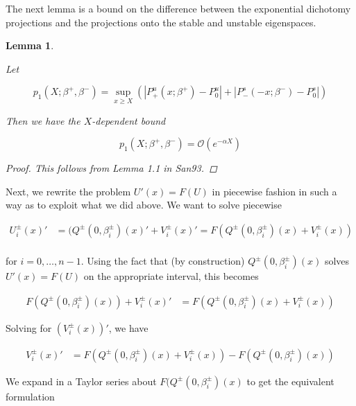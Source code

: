 \documentclass[12pt]{article}
\newtheorem{lemma}{Lemma}
\begin{document}
The next lemma is a bound on the difference between the exponential dichotomy projections and the projections onto the stable and unstable eigenspaces.


\begin{lemma}\label{p1}

Let 

\begin{equation}
p_1(X; \beta^+, \beta^-) = \sup_{x \geq X} (|P^u_+(x; \beta^+) - P_0^u| + |P^s_-(-x; \beta^-) - P_0^s|)
\end{equation}

Then we have the $X$-dependent bound

\begin{equation}
p_1(X; \beta^+, \beta^-) = \mathcal{O}(e^{-\alpha X})
\end{equation} 

\begin{proof}
This follows from Lemma 1.1 in San93.
\end{proof}

\end{lemma}


Next, we rewrite the problem $U'(x) = F(U)$ in piecewise fashion in such a way as to exploit what we did above. We want to solve piecewise

\begin{align*}
U_i^\pm(x)' &= (Q^\pm(0, \beta_i^\pm)(x)' + V_i^\pm(x)' = F\left(Q^\pm(0, \beta_i^\pm)(x) + V_i^\pm(x) \right) \\
\end{align*}

for $i = 0, \dots, n-1$. Using the fact that (by construction) $Q^\pm(0, \beta_i^\pm)(x)$ solves $U'(x) = F(U)$ on the appropriate interval, this becomes

\begin{align*}
F(Q^\pm(0, \beta_i^\pm)(x)) + V_i^\pm(x)' &= F(Q^\pm(0, \beta_i^\pm)(x) + V_i^\pm(x) )
\end{align*}

Solving for $(V_i^\pm(x))'$, we have

\begin{align*}
V_i^\pm(x)' &= F(Q^\pm(0, \beta_i^\pm)(x) + V_i^\pm(x) ) - F(Q^\pm(0, \beta_i^\pm)(x) )
\end{align*}

We expand in a Taylor series about $F(Q^\pm(0, \beta_i^\pm)(x)$ to get the equivalent formulation
\end{document}
